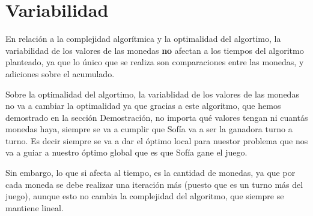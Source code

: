 \section{Variabilidad}

 En relación a la complejidad algorítmica y la optimalidad del algortimo, la variabilidad de los valores de las monedas \textbf{no} afectan a los tiempos del algoritmo planteado, ya que lo único que se realiza son comparaciones entre las monedas, y adiciones sobre el acumulado.

 Sobre la optimalidad del algortimo, la variablidad de los valores de las monedas no va a cambiar la optimalidad ya que gracias a este algoritmo, que hemos demostrado en la sección Demostración, no importa qué valores tengan ni cuantás monedas haya, siempre se va a cumplir que Sofía va a ser la ganadora turno a turno. Es decir siempre se va a dar el óptimo local para nuestor problema que nos va a guiar a nuestro óptimo global que es que Sofía gane el juego.

 Sin embargo, lo que si afecta al tiempo, es la cantidad de monedas, ya que por cada moneda se debe realizar una iteración más (puesto que es un turno más del juego), aunque esto no cambia la complejidad del algoritmo, que siempre se mantiene lineal.



